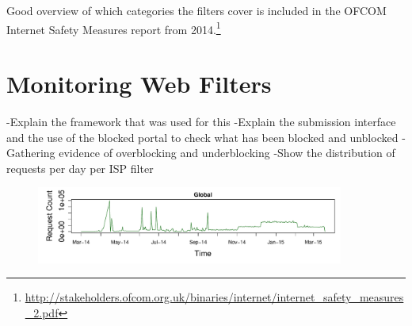 \documentclass{bmcart}
\begin{document}
Good overview of which categories the filters cover is included in the OFCOM Internet Safety Measures report from 2014.\footnote{\url{http://stakeholders.ofcom.org.uk/binaries/internet/internet_safety_measures_2.pdf}}


\clearpage
\section*{Monitoring Web Filters}
-Explain the framework that was used for this
-Explain the submission interface and the use of the blocked portal to check what has been blocked and unblocked
-Gathering evidence of overblocking and underblocking
-Show the distribution of requests per day per ISP filter

\begin{figure}[h!]
\caption{}
\includegraphics[width=0.9\textwidth]{imgs/ts-global-requests.pdf}
\end{figure}

\end{document}
